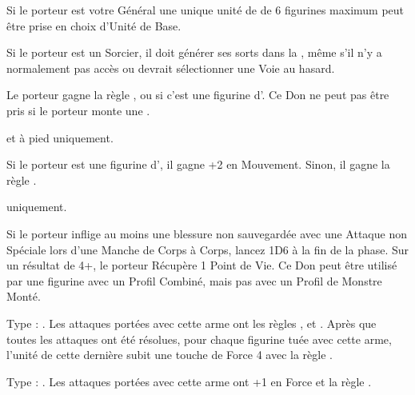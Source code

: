 \begin{multicols}{2}
Si le porteur est votre Général une unique unité de \wastelandtrolls{} de 6 figurines maximum peut être prise en choix d'Unité de Base.

Si le porteur est un Sorcier, il doit générer ses sorts dans la \Pathof{} \wilderness{}, même s'il n'y a normalement pas accès ou devrait sélectionner une Voie au hasard.

 Le porteur gagne la règle , ou  si c'est une figurine d'\infantry{}. Ce Don ne peut pas être pris si le porteur monte une \manticore{}.

 \textbf{\dlust} et à pied uniquement.

Si le porteur est une figurine d'\infantry{}, il gagne +2 en Mouvement. Sinon, il gagne la règle \swiftstride{}.

 \textbf{\wrath} uniquement.

Si le porteur inflige au moins une blessure non sauvegardée avec une Attaque non Spéciale lors d'une Manche de Corps à Corps, lancez 1D6 à la fin de la phase. Sur un résultat de 4+, le porteur Récupère 1 Point de Vie. Ce Don peut être utilisé par une figurine avec un Profil Combiné, mais pas avec un Profil de Monstre Monté.

\endpricelistNSP

\end{multicols}

\closearmynewsection









\startarmymagicalitems

\armymagicalweapons

\startpricelist

 Type : \hw{}. Les attaques portées avec cette arme ont les règles \flamingattacks{},  et . Après que toutes les attaques ont été résolues, pour chaque figurine tuée avec cette arme, l'unité de cette dernière subit une touche de Force 4 avec la règle \flamingattacks{}.

 Type : \spear{}. Les attaques portées avec cette arme ont +1 en Force et la règle .

\endpricelist

\armymagicalarmour

